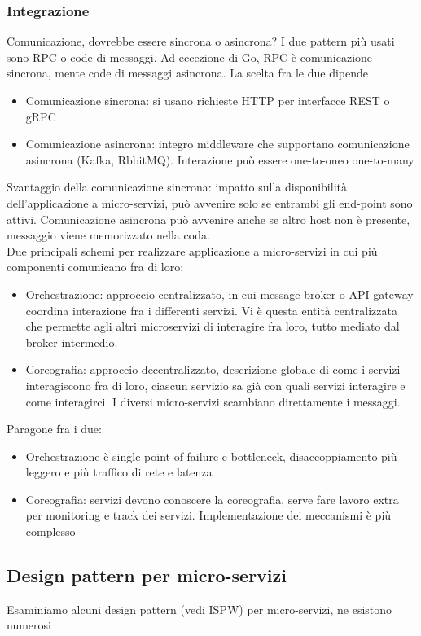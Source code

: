 \documentclass{article}
\begin{document}
\subsubsection{Integrazione}
Comunicazione, dovrebbe essere sincrona o asincrona? I due pattern più usati sono RPC o code di messaggi. Ad eccezione di Go, RPC è comunicazione sincrona,  mente code di messaggi asincrona. La scelta fra le due dipende
\begin{itemize}
\item Comunicazione sincrona: si usano richieste HTTP per interfacce REST o gRPC
\item Comunicazione asincrona: integro middleware che supportano comunicazione asincrona (Kafka, RbbitMQ). Interazione può essere one-to-oneo one-to-many
\end{itemize}
Svantaggio della comunicazione sincrona: impatto sulla disponibilità dell'applicazione a micro-servizi, può avvenire solo se entrambi gli end-point sono attivi. Comunicazione asincrona può avvenire anche se altro host non è presente, messaggio viene memorizzato nella coda.
\\ Due principali schemi per realizzare applicazione a micro-servizi in cui più componenti comunicano fra di loro:
\begin{itemize}
\item Orchestrazione: approccio centralizzato, in cui message broker o API gateway coordina interazione fra i differenti servizi. Vi è questa entità centralizzata che permette agli altri microservizi di interagire fra loro, tutto mediato dal broker intermedio.
\item Coreografia: approccio decentralizzato, descrizione globale di come i servizi interagiscono fra di loro, ciascun servizio sa già con quali servizi interagire e come interagirci. I diversi micro-servizi scambiano direttamente i messaggi.
\end{itemize}
Paragone fra i due:
\begin{itemize}
\item Orchestrazione è single point of failure e bottleneck, disaccoppiamento più leggero e più traffico di rete e latenza
\item Coreografia: servizi devono conoscere la coreografia, serve fare lavoro extra per monitoring e track dei servizi. Implementazione dei meccanismi è più complesso
\end{itemize}
\subsection{Design pattern per micro-servizi}
Esaminiamo alcuni design pattern (vedi ISPW) per micro-servizi, ne esistono numerosi
\end{document}
